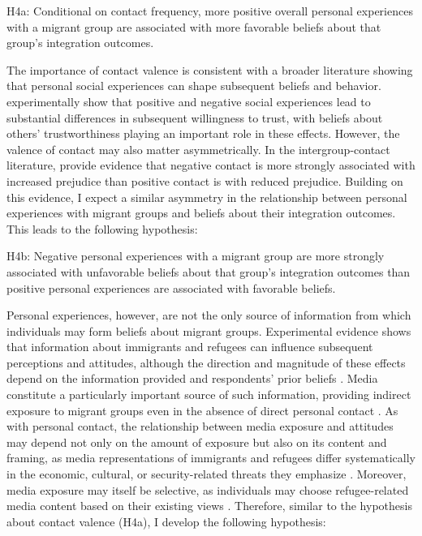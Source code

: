 H4a: Conditional on contact frequency, more positive overall personal experiences with a migrant group are associated 
with more favorable beliefs about that group’s integration outcomes.\bigskip

The importance of contact valence is consistent with a broader literature showing that personal social experiences can 
shape subsequent beliefs and behavior. \citet{schwerter2020determinants} experimentally show that positive and negative 
social experiences lead to substantial differences in subsequent willingness to trust, with beliefs about others’ 
trustworthiness playing an important role in these effects. However, the valence of contact may also matter asymmetrically. 
In the intergroup-contact literature, \citet{paolini2024negativity} provide evidence that negative contact is more strongly 
associated with increased prejudice than positive contact is with reduced prejudice. 
Building on this evidence, I expect a similar asymmetry in the relationship between personal experiences with migrant 
groups and beliefs about their integration outcomes. This leads to the following hypothesis:\bigskip

H4b: Negative personal experiences with a migrant group are more strongly associated with unfavorable beliefs about 
that group’s integration outcomes than positive personal experiences are associated with favorable beliefs.\bigskip

Personal experiences, however, are not the only source of information from which individuals may form beliefs about migrant groups.
Experimental evidence shows that information about immigrants and refugees can influence subsequent perceptions and 
attitudes, although the direction and magnitude of these effects depend on the information provided and 
respondents’ prior beliefs \citep{hayo2023between, dylong2026intergroup, guenther2024revisiting}.
Media constitute a particularly important source of such information, providing indirect exposure to migrant 
groups even in the absence of direct personal contact \citep{schiappa2005parasocial, de2021contact}. As with personal contact, the relationship between 
media exposure and attitudes may depend not only on the amount of exposure but also on its content and framing, as media
representations of immigrants and refugees differ systematically in the economic, cultural, or security-related threats they emphasize
\citep{atwell2016media, jacobs2016news}. Moreover, media exposure may itself be selective, as individuals may choose 
refugee-related media content based on their existing views \citep{lueders2019refugees}. Therefore, similar to the hypothesis 
about contact valence (H4a), I develop the following hypothesis:\bigskip

